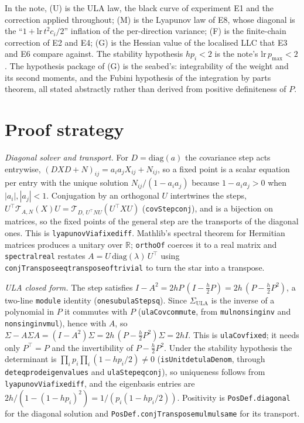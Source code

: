 \documentclass[11pt]{article}
\newcommand{\R}{\mathbb{R}}
\newcommand{\lr}{\mathrm{lr}}
\newcommand{\code}[1]{{\def\_{\textunderscore\allowbreak}\texttt{#1}}}
\begin{document}
In the note, (U) is the ULA law, the black curve of experiment E1 and
the correction applied throughout; (M) is the Lyapunov law of E8, whose
diagonal is the ``$1 + \lr\,t^2 c_i/2$'' inflation of the per-direction
variance; (F) is the finite-chain correction of E2 and E4; (G) is the
Hessian value of the localised LLC that E3 and E6 compare against. The
stability hypothesis $hp_i < 2$ is the note's $\lr\,p_{\max} < 2$. The
hypothesis package of (G) is the seabed's: integrability of the weight
and its second moments, and the Fubini hypothesis of the integration by
parts theorem, all stated abstractly rather than derived from positive
definiteness of $P$.

\section{Proof strategy}

\emph{Diagonal solver and transport.} For $D = \mathrm{diag}(a)$ the
covariance step acts entrywise, $(DXD + N)_{ij} = a_ia_jX_{ij} + N_{ij}$,
so a fixed point is a scalar equation per entry with the unique solution
$N_{ij}/(1 - a_ia_j)$ because $1 - a_ia_j > 0$ when $|a_i|, |a_j| < 1$.
Conjugation by an orthogonal $U$ intertwines the steps,
$U^\top\mathcal T_{A,N}(X)U = \mathcal T_{D,\,U^\top NU}(U^\top XU)$
(\code{covStep\_conj}), and is a bijection on matrices, so the fixed
points of the general step are the transports of the diagonal ones. This
is \code{lyapunovVia\_fixed\_iff}. Mathlib's spectral theorem for
Hermitian matrices produces a unitary over $\R$; \code{orthoOf} coerces
it to a real matrix and \code{spectral\_real} restates
$A = U\,\mathrm{diag}(\lambda)\,U^\top$ using
\code{conjTranspose\_eq\_transpose\_of\_trivial} to turn the star into a
transpose.

\emph{ULA closed form.} The step satisfies $I - A^2 = 2hP\,(I -
\tfrac h2P) = 2h\,(P - \tfrac h2P^2)$, a two-line \code{module} identity
(\code{one\_sub\_ulaStep\_sq}). Since $\Sigma_{\mathrm{ULA}}$ is the
inverse of a polynomial in $P$ it commutes with $P$
(\code{ulaCov\_commute}, from \code{mul\_nonsing\_inv} and
\code{nonsing\_inv\_mul}), hence with $A$, so $\Sigma - A\Sigma A = (I -
A^2)\Sigma = 2h\,(P - \tfrac h2P^2)\Sigma = 2hI$. This is
\code{ulaCov\_fixed}; it needs only $P^\top = P$ and the invertibility of
$P - \tfrac h2P^2$. Under the stability hypothesis the determinant is
$\prod_i p_i \prod_i(1 - hp_i/2) \ne 0$ (\code{isUnit\_det\_ulaDenom},
through \code{det\_eq\_prod\_eigenvalues} and \code{ulaStep\_eq\_conj}),
so uniqueness follows from \code{lyapunovVia\_fixed\_iff}, and the
eigenbasis entries are $2h/(1 - (1 - hp_i)^2) = 1/(p_i(1 - hp_i/2))$.
Positivity is \code{PosDef.diagonal} for the diagonal solution and
\code{PosDef.conjTranspose\_mul\_mul\_same} for its transport.
\end{document}
